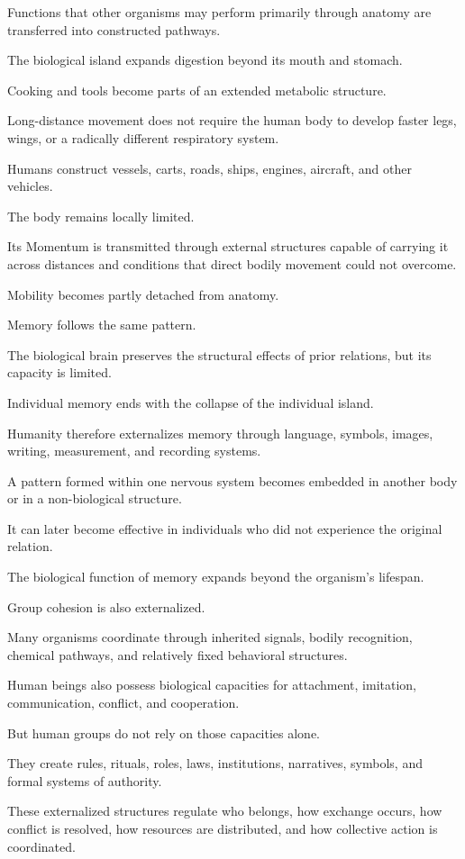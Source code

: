 Functions that other organisms may perform primarily through anatomy are transferred into constructed pathways.

The biological island expands digestion beyond its mouth and stomach.

Cooking and tools become parts of an extended metabolic structure.

Long-distance movement does not require the human body to develop faster legs, wings, or a radically different respiratory system.

Humans construct vessels, carts, roads, ships, engines, aircraft, and other vehicles.

The body remains locally limited.

Its Momentum is transmitted through external structures capable of carrying it across distances and conditions that direct bodily movement could not overcome.

Mobility becomes partly detached from anatomy.

Memory follows the same pattern.

The biological brain preserves the structural effects of prior relations, but its capacity is limited.

Individual memory ends with the collapse of the individual island.

Humanity therefore externalizes memory through language, symbols, images, writing, measurement, and recording systems.

A pattern formed within one nervous system becomes embedded in another body or in a non-biological structure.

It can later become effective in individuals who did not experience the original relation.

The biological function of memory expands beyond the organism’s lifespan.

Group cohesion is also externalized.

Many organisms coordinate through inherited signals, bodily recognition, chemical pathways, and relatively fixed behavioral structures.

Human beings also possess biological capacities for attachment, imitation, communication, conflict, and cooperation.

But human groups do not rely on those capacities alone.

They create rules, rituals, roles, laws, institutions, narratives, symbols, and formal systems of authority.

These externalized structures regulate who belongs, how exchange occurs, how conflict is resolved, how resources are distributed, and how collective action is coordinated.

